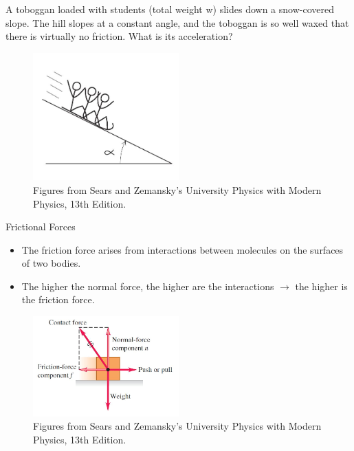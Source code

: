 \documentclass[]{beamer}
\begin{document}


    \begin{frame}
      
      A toboggan loaded with students (total weight w) slides down a
      snow-covered slope. The hill slopes at a constant angle, and the
      toboggan is so well waxed that there is virtually no friction. What
      is its acceleration?

      \begin{figure}[h!]  
        \includegraphics[width=0.5\textwidth]{images/f18.jpg}
        \caption{ {\tiny Figures from Sears and Zemansky's University Physics 
        with Modern Physics, 13th Edition.} }
      \end{figure}


      \end{frame}





    \begin{frame}
      
  Frictional Forces
\vspace{3mm}



\begin{itemize}
  \item The  friction force arises from interactions between molecules
  on the surfaces of two bodies.
  \item The higher the normal force, the higher are the interactions $\rightarrow$ the higher is the friction force.
\end{itemize}


\begin{figure}[h!]  
  \includegraphics[width=0.5\textwidth]{images/f19.jpg}
  \caption{ {\tiny Figures from Sears and Zemansky's University Physics 
  with Modern Physics, 13th Edition.} }
\end{figure}
      \end{frame}
\end{document}
